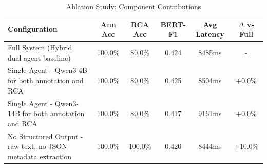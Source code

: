 \begin{table}[h]
\centering
\caption{Ablation Study: Component Contributions}
\label{tab:ablation}
\begin{tabular}{lccccc}
\toprule
\textbf{Configuration} & \textbf{Ann Acc} & \textbf{RCA Acc} & \textbf{BERT-F1} & \textbf{Avg Latency} & \textbf{$\Delta$ vs Full} \\
\midrule
Full System (Hybrid dual-agent baseline) & 100.0\% & 80.0\% & 0.424 & 8485ms & - \\
Single Agent - Qwen3-4B for both annotation and RCA & 100.0\% & 80.0\% & 0.425 & 8504ms & +0.0\% \\
Single Agent - Qwen3-14B for both annotation and RCA & 100.0\% & 80.0\% & 0.417 & 9161ms & +0.0\% \\
No Structured Output - raw text, no JSON metadata extraction & 100.0\% & 100.0\% & 0.420 & 8444ms & +10.0\% \\
\bottomrule
\end{tabular}
\end{table}
